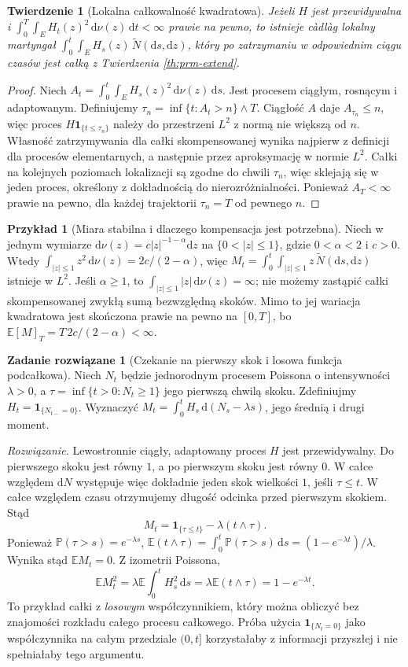 \documentclass[11pt,a4paper,oneside]{report}
\numberwithin{equation}{chapter}
\theoremstyle{plain}
\newtheorem{twierdzenie}{Twierdzenie}[chapter]
\theoremstyle{definition}
\newtheorem{przyklad}{Przykład}[chapter]
\newtheorem{zadanie}{Zadanie rozwiązane}[chapter]
\theoremstyle{remark}
\newcommand{\Prob}{\mathbb{P}}
\newcommand{\E}{\mathbb{E}}
\newcommand{\ind}[1]{\mathbf{1}_{#1}}
\newcommand{\dd}{\mathrm{d}}
\begin{document}
\begin{twierdzenie}[Lokalna całkowalność kwadratowa]\label{thm:volIII:11:06}
\label{th:prm-local}
Jeżeli $H$ jest przewidywalna i
$\int_0^T\int_EH_t(z)^2\,\dd\nu(z)\,\dd t<\infty$
prawie na pewno, to istnieje càdlàg lokalny martyngał
$\int_0^t\int_EH_s(z)\,\widetilde N(\dd s,\dd z)$,
który po zatrzymaniu w odpowiednim ciągu czasów
jest całką z Twierdzenia \ref{th:prm-extend}.
\end{twierdzenie}
\begin{proof}
Niech $A_t=\int_0^t\int_EH_s(z)^2\,\dd\nu(z)\,\dd s$.
Jest procesem ciągłym, rosnącym i adaptowanym.
Definiujemy $\tau_n=\inf\{t:A_t>n\}\wedge T$.
Ciągłość $A$ daje $A_{\tau_n}\le n$, więc proces
$H\ind{\{t\le\tau_n\}}$ należy do przestrzeni $L^2$
z normą nie większą od $n$. Własność zatrzymywania dla
całki skompensowanej wynika najpierw z definicji dla
procesów elementarnych, a następnie przez aproksymację
w normie $L^2$. Całki na kolejnych poziomach lokalizacji
są zgodne do chwili $\tau_n$, więc sklejają się w jeden
proces, określony z dokładnością do nierozróżnialności.
Ponieważ $A_T<\infty$ prawie na pewno, dla każdej
trajektorii $\tau_n=T$ od pewnego $n$.
\end{proof}

\begin{przyklad}[Miara stabilna i dlaczego kompensacja jest potrzebna]
Niech w jednym wymiarze $\dd\nu(z)=c|z|^{-1-\alpha}\dd z$
na $\{0<|z|\le1\}$, gdzie $0<\alpha<2$ i $c>0$.
Wtedy $\int_{|z|\le1}z^2\,\dd\nu(z)=2c/(2-\alpha)$,
więc $M_t=\int_0^t\int_{|z|\le1}z\,\widetilde N(\dd s,\dd z)$
istnieje w $L^2$. Jeśli $\alpha\ge1$, to
$\int_{|z|\le1}|z|\,\dd\nu(z)=\infty$; nie możemy
zastąpić całki skompensowanej zwykłą sumą bezwzględną
skoków. Mimo to jej wariacja kwadratowa jest skończona
prawie na pewno na $[0,T]$, bo
$\E[M]_T=T\,2c/(2-\alpha)<\infty$.
\end{przyklad}

\begin{zadanie}[Czekanie na pierwszy skok i losowa funkcja podcałkowa]
Niech $N_t$ będzie jednorodnym procesem Poissona o intensywności
$\lambda>0$, a $\tau=\inf\{t>0:N_t\ge1\}$ jego pierwszą chwilą
skoku. Zdefiniujmy $H_t=\ind{\{N_{t-}=0\}}$.
Wyznaczyć $M_t=\int_0^tH_s\,\dd(N_s-\lambda s)$, jego
średnią i drugi moment.

\emph{Rozwiązanie.} Lewostronnie ciągły, adaptowany proces
$H$ jest przewidywalny. Do pierwszego skoku jest równy $1$,
a po pierwszym skoku jest równy $0$. W całce względem
$\dd N$ występuje więc dokładnie jeden skok wielkości $1$,
jeśli $\tau\le t$. W całce względem czasu otrzymujemy
długość odcinka przed pierwszym skokiem. Stąd
\[
M_t=\ind{\{\tau\le t\}}-\lambda(t\wedge\tau).
\]
Ponieważ $\Prob(\tau>s)=e^{-\lambda s}$,
$\E(t\wedge\tau)=\int_0^t\Prob(\tau>s)\,\dd s
=(1-e^{-\lambda t})/\lambda$.
Wynika stąd $\E M_t=0$. Z izometrii Poissona,
\[
\E M_t^2=\lambda\E\int_0^tH_s^2\,\dd s
=\lambda\E(t\wedge\tau)=1-e^{-\lambda t}.
\]
To przykład całki z \emph{losowym} współczynnikiem,
który można obliczyć bez znajomości rozkładu całego procesu
całkowego. Próba użycia $\ind{\{N_t=0\}}$ jako współczynnika
na całym przedziale $(0,t]$ korzystałaby z informacji
przyszłej i nie spełniałaby tego argumentu.
\end{zadanie}
\end{document}
